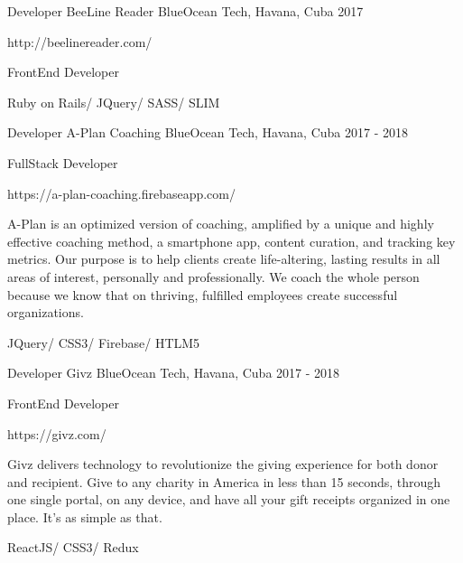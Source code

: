 \begin{cventries}
\cventry
{Developer} %
{BeeLine Reader} %
{BlueOcean Tech, Havana, Cuba} %
{2017} %
{ %
\begin{cvitems}
\item {http://beelinereader.com/}
\item {FrontEnd Developer}
\item {Ruby on Rails/ JQuery/ SASS/ SLIM}
\end{cvitems}
}


\cventry
{Developer} %
{A-Plan Coaching} %
{BlueOcean Tech, Havana, Cuba} %
{2017 - 2018} %
{ %
\begin{cvitems}
\item {FullStack Developer}
\item {https://a-plan-coaching.firebaseapp.com/}
\item {A-Plan is an optimized version of coaching, amplified by a unique and highly effective coaching method, a smartphone app, content curation, and tracking key metrics. Our purpose is to help clients create life-altering, lasting results in all areas of interest, personally and professionally. We coach the whole person because we know that  on thriving, fulfilled employees create successful organizations.}
\item {JQuery/ CSS3/ Firebase/ HTLM5}
\end{cvitems}
}


\cventry
{Developer} %
{Givz} %
{BlueOcean Tech, Havana, Cuba} %
{2017 - 2018} %
{ %
\begin{cvitems}
\item {FrontEnd Developer}
\item {https://givz.com/}
\item {Givz delivers technology to revolutionize the giving experience for both donor and recipient. Give to any charity in America in less than 15 seconds, through one single portal, on any device, and have all your gift receipts organized in one place. It’s as simple as that.}
\item {ReactJS/ CSS3/ Redux}
\end{cvitems}
}



\end{cventries}
